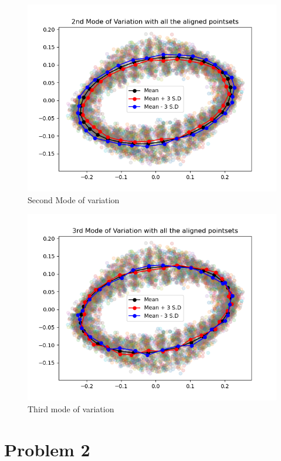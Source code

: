 \documentclass{article}
\begin{document}
\begin{figure}[H]
    \centerline{\includegraphics[scale=0.45]{../results/ellipses/mean-and-second-mode_2.png}}
    \caption{Second Mode of variation}
\end{figure}

\begin{figure}[H]
    \centerline{\includegraphics[scale=0.45]{../results/ellipses/mean-and-third-mode_2.png}}
    \caption{Third mode of variation}
\end{figure}

\section{Problem 2}
\end{document}
